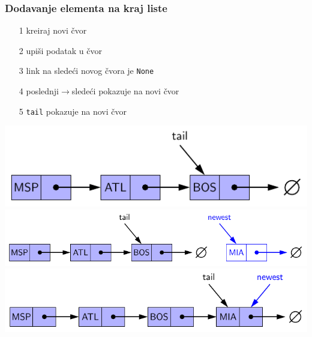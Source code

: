 \documentclass[compress,aspectratio=169]{beamer}
\begin{document}
\begin{frame}[fragile]
  \frametitle{Dodavanje elementa na kraj liste}
  \begin{itemize}
    \item[1] kreiraj novi čvor
    \item[2] upiši podatak u čvor
    \item[3] link na sledeći novog čvora je \texttt{None}
    \item[4] poslednji$\rightarrow$sledeći pokazuje na novi čvor
    \item[5] \texttt{tail} pokazuje na novi čvor
  \end{itemize}
  \begin{center}
    \includegraphics[scale=0.6]{asp-07-pic04a.pdf} \\
    \includegraphics[scale=0.6]{asp-07-pic04b.pdf} \\
    \includegraphics[scale=0.6]{asp-07-pic04c.pdf}
  \end{center}
\end{frame}
\end{document}

